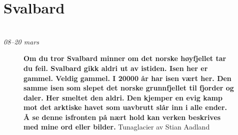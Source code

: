 \chapter*{Svalbard}\\ {\footnotesize \textit{08--20 mars}}

\begin{figure}[H]
	\centering
\noindent{}
	\caption*{\textbf{Om du tror Svalbard minner om det norske høyfjellet tar du feil.
Svalbard gikk aldri ut av istiden.
Isen
her er gammel. Veldig gammel. I 20000 år har isen vært her.  
Den samme isen som
slepet det norske grunnfjellet til fjorder og daler. Her smeltet den
aldri. Den kjemper en evig kamp mot det arktiske havet som uavbrutt slår inn i alle ender. Å se denne isfronten på nært hold kan
verken beskrives med mine ord eller bilder.} Tunaglacier av Stian
Aadland}

	\label{fig:stianglacier}
\end{figure}



